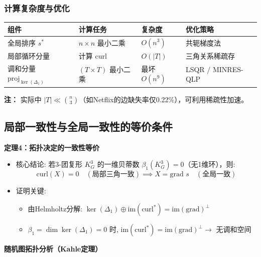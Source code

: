 \documentclass[a4paper]{article}
\begin{document}
\subsubsection{计算复杂度与优化}

\begin{table}[h]
    \centering
    \begin{tabular}{m{4cm} m{4cm} m{3cm} m{6cm}}
        \textbf{组件} & \textbf{计算任务} & \textbf{复杂度} & \textbf{优化策略} \\
        \hline
        全局排序 $s^*$ & $n \times n$ 最小二乘 & $O(n^3)$ & 共轭梯度法 \\
        \hline
        局部循环分量 & 计算 $\text{curl}$ & $O(|T|)$ & 三角关系稀疏存 \\
        \hline
        调和分量 $\text{proj}_{\ker(\Delta_1)}$ & $(T \times T)$ 最小二乘 & 最坏$O(n^9)$ & LSQR / MINRES-QLP\\
    \end{tabular}
\end{table}

\textbf{注：} 实际中 $|T| \ll \binom{n}{3}$（如Netflix的边缺失率仅0.22\%），可利用稀疏性加速。

\subsection{局部一致性与全局一致性的等价条件}

\textbf{定理4：拓扑决定的一致性等价}

\begin{itemize}
    \item 核心结论: 若3-团复形 $K_G^3$ 的一维贝蒂数 $\beta_1(K_G^3) = 0$（无1维环），则:
    $$
    \text{curl}(X) = 0 \quad (\text{局部三角一致}) \implies X = \text{grad } s \quad (\text{全局一致})
    $$
    
    \item 证明关键:
    \begin{itemize}
        \item 由Helmholtz分解: $\ker(\Delta_1) \oplus \text{im}(\text{curl}^*) = \text{im}(\text{grad})^\perp$
        \item $\beta_1 = \dim \ker(\Delta_1) = 0$ 时, $\text{im}(\text{curl}^*) = \text{im}(\text{grad})^\perp \rightarrow$ 无调和空间
    \end{itemize}
\end{itemize}
\textbf{随机图拓扑分析（Kahle定理）}
\end{document}
